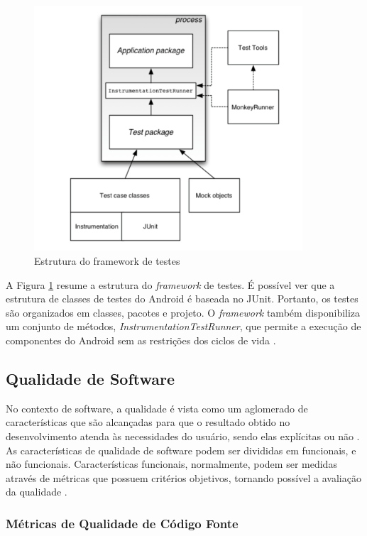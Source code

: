 \begin{figure}[H]
  \centering
  \includegraphics[width=10cm]{figuras/android_test.png}
  \caption{Estrutura do framework de testes \cite{androidTesting2015}}
  \label{figura:testes}
\end{figure}

A Figura \ref{figura:testes} resume a estrutura do \textit{framework} de
testes. É possível ver que a estrutura de classes de testes do Android é
baseada no JUnit. Portanto, os testes são organizados em classes, pacotes e
projeto. O \textit{framework} também disponibiliza um conjunto de métodos,
\textit{InstrumentationTestRunner}, que permite a execução de componentes do
Android sem as restrições dos ciclos de vida \cite{androidTesting2015}.


  \subsection{Qualidade de Software}
  \label{subsec:qualidadedesoftware}

No contexto de software, a qualidade é vista como um aglomerado de
características que são alcançadas para que o resultado obtido no
desenvolvimento atenda às necessidades do usuário, sendo elas explícitas ou não
\cite{rocha2001}. As características de qualidade de software podem ser
divididas em funcionais, e não funcionais. Características funcionais,
normalmente, podem ser medidas através de métricas que possuem critérios
objetivos, tornando possível a avaliação da qualidade \cite{meirelles2013}.

    \subsubsection{Métricas de Qualidade de Código Fonte}

